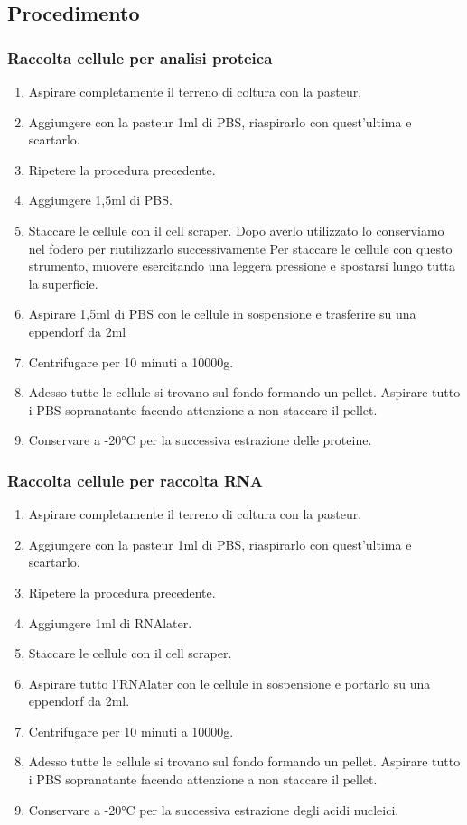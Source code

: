 \subsection{Procedimento}

\subsubsection{Raccolta cellule per analisi proteica}

\begin{enumerate}

\item Aspirare completamente il terreno di coltura con la pasteur.
\item Aggiungere con la pasteur 1ml di PBS, riaspirarlo con quest'ultima e scartarlo.
\item Ripetere la procedura precedente.
\item Aggiungere 1,5ml di PBS.
\item Staccare le cellule con il cell scraper. 
Dopo averlo utilizzato lo conserviamo nel fodero per riutilizzarlo successivamente
Per staccare le cellule con questo strumento, muovere esercitando una leggera pressione
e spostarsi lungo tutta la superficie.
\item Aspirare 1,5ml di PBS con le cellule in sospensione e trasferire su una eppendorf da 2ml
\item Centrifugare per 10 minuti a 10000g.
\item Adesso tutte le cellule si trovano sul fondo formando un pellet. Aspirare tutto
i PBS sopranatante facendo attenzione a non staccare il pellet.
\item Conservare a -20°C per la successiva estrazione delle proteine.

\end{enumerate}

\subsubsection{Raccolta cellule per raccolta RNA}

\begin{enumerate}
    \item Aspirare completamente il terreno di coltura con la pasteur.
    \item Aggiungere con la pasteur 1ml di PBS, riaspirarlo con quest'ultima e scartarlo.
    \item Ripetere la procedura precedente.
    \item Aggiungere 1ml di RNAlater.
    \item Staccare le cellule con il cell scraper. 
    \item Aspirare tutto l'RNAlater con le cellule in sospensione e portarlo su una 
    eppendorf da 2ml.
    \item Centrifugare per 10 minuti a 10000g.
    \item Adesso tutte le cellule si trovano sul fondo formando un pellet. Aspirare tutto
    i PBS sopranatante facendo attenzione a non staccare il pellet.
    \item Conservare a -20°C per la successiva estrazione degli acidi nucleici.
\end{enumerate}
    
